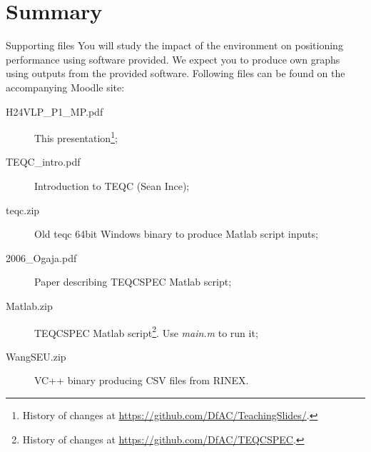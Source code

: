 \documentclass[11pt]{beamer}
\newcommand{\MatlabRef}{\footnote{History of changes at \url{https://github.com/DfAC/TEQCSPEC}.}}
\newcommand{\thisDocRef}{\footnote{History of changes at \url{https://github.com/DfAC/TeachingSlides/}.}}
\begin{document}
\section{Summary}


	\begin{frame}{Supporting files}
	You will study the impact of the environment on positioning performance using software provided. We expect you to produce own graphs using outputs from the provided software. Following files can be found on the accompanying Moodle site:

		\begin{description}
		\item[H24VLP\_P1\_MP.pdf] This presentation\thisDocRef;
		\item[TEQC\_intro.pdf] Introduction to TEQC (Sean Ince);
		\item[teqc.zip] Old teqc 64bit Windows binary to produce Matlab script inputs;
		\item[2006\_Ogaja.pdf] Paper describing TEQCSPEC Matlab script;
		\item[Matlab.zip] TEQCSPEC Matlab script\MatlabRef. Use \textit{main.m} to run it;
		\item[WangSEU.zip] VC++ binary producing CSV files from RINEX.
	\end{description}

	\end{frame}


\end{document}

